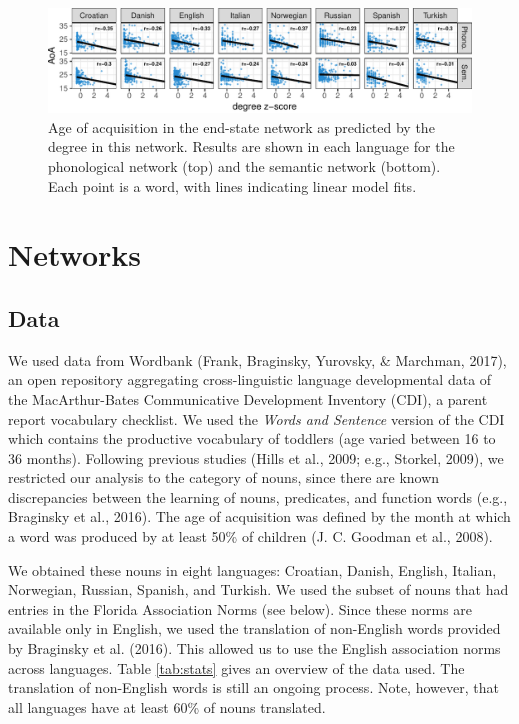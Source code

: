 \documentclass[10pt, letterpaper]{article}
\newenvironment{CodeChunk}{}{}
\begin{document}
\begin{CodeChunk}
\begin{figure}[h]

{\centering \includegraphics{figs/all_data-1} 

}

\caption{\label{fig:data_all}Age of acquisition in the end-state network as predicted by the degree in this network. Results are shown in each language for the phonological network (top) and the semantic network (bottom). Each point is a word, with lines indicating linear model fits.}\label{fig:all_data}
\end{figure}
\end{CodeChunk}

\section{Networks}\label{networks}

\subsection{Data}\label{data}

We used data from Wordbank (Frank, Braginsky, Yurovsky, \& Marchman,
2017), an open repository aggregating cross-linguistic language
developmental data of the MacArthur-Bates Communicative Development
Inventory (CDI), a parent report vocabulary checklist. We used the
\emph{Words and Sentence} version of the CDI which contains the
productive vocabulary of toddlers (age varied between 16 to 36 months).
Following previous studies (Hills et al., 2009; e.g., Storkel, 2009), we
restricted our analysis to the category of nouns, since there are known
discrepancies between the learning of nouns, predicates, and function
words (e.g., Braginsky et al., 2016). The age of acquisition was defined
by the month at which a word was produced by at least 50\% of children
(J. C. Goodman et al., 2008).

We obtained these nouns in eight languages: Croatian, Danish, English,
Italian, Norwegian, Russian, Spanish, and Turkish. We used the subset of
nouns that had entries in the Florida Association Norms (see below).
Since these norms are available only in English, we used the translation
of non-English words provided by Braginsky et al. (2016). This allowed
us to use the English association norms across languages. Table
\ref{tab:stats} gives an overview of the data used. The translation of
non-English words is still an ongoing process. Note, however, that all
languages have at least 60\% of nouns translated.
\end{document}
